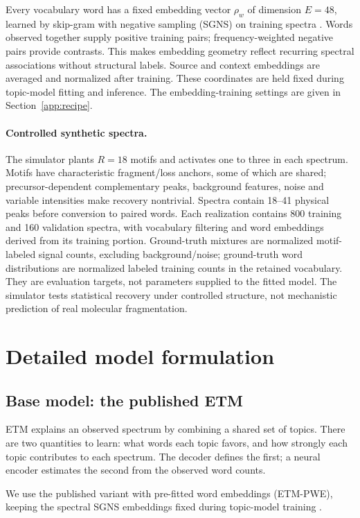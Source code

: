 \documentclass[10pt,a4paper]{article}
\begin{document}
Every vocabulary word has a fixed embedding vector $\rho_w$ of dimension $E=48$,
learned by skip-gram with negative sampling (SGNS) on training spectra
\cite{mikolov2013}. Words observed together supply positive training pairs;
frequency-weighted negative pairs provide contrasts. This makes embedding
geometry reflect recurring spectral associations without structural labels.
Source and context embeddings are averaged and normalized after training.
These coordinates are held fixed during topic-model fitting and inference.
The embedding-training settings are given in Section~\ref{app:recipe}.

\paragraph{Controlled synthetic spectra.}
The simulator plants $R=18$ motifs and activates one to three in each spectrum.
Motifs have characteristic fragment/loss anchors, some of which are shared;
precursor-dependent complementary peaks, background features, noise and
variable intensities make recovery nontrivial. Spectra contain 18--41 physical
peaks before conversion to paired words. Each realization contains 800 training
and 160 validation spectra, with vocabulary filtering and word embeddings
derived from its training portion. Ground-truth mixtures are normalized
motif-labeled signal counts, excluding background/noise; ground-truth word
distributions are normalized labeled training counts in the retained vocabulary.
They are evaluation targets, not parameters supplied to the fitted model.
The simulator tests statistical recovery under controlled structure, not
mechanistic prediction of real molecular fragmentation.


\section{Detailed model formulation}
\label{sec:model}
\subsection{Base model: the published ETM}
\label{sec:base-etm}

ETM explains an observed spectrum by combining a shared set of topics.
There are two quantities to learn: what words each topic favors, and how
strongly each topic contributes to each spectrum. The decoder defines the
first; a neural encoder estimates the second from the observed word counts.

We use the published variant with pre-fitted word embeddings (ETM-PWE),
keeping the spectral SGNS embeddings fixed during topic-model training
\cite{dieng2020}.
\end{document}

